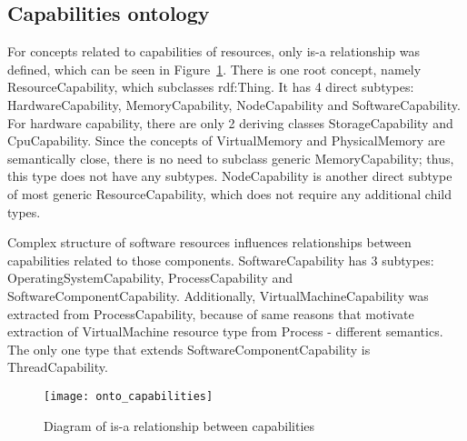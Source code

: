 \pagebreak

\subsection{Capabilities ontology}
\label{subsec:arch_knowledge_capabilitie}

For concepts related to capabilities of resources, only is-a relationship was defined, which can be seen in Figure~\ref{fig:onto_capabilities}. There is one root concept, namely ResourceCapability, which subclasses rdf:Thing. It has 4 direct subtypes: HardwareCapability, MemoryCapability, NodeCapability and SoftwareCapability. For hardware capability, there are only 2 deriving classes StorageCapability and CpuCapability. Since the concepts of VirtualMemory and PhysicalMemory are semantically close, there is no need to subclass generic MemoryCapability; thus, this type does not have any subtypes. NodeCapability is another direct subtype of most generic ResourceCapability, which does not require any additional child types.

Complex structure of software resources influences relationships between capabilities related to those components. SoftwareCapability has 3 subtypes: OperatingSystemCapability, ProcessCapability and SoftwareComponentCapability. Additionally, VirtualMachineCapability was extracted from ProcessCapability, because of same reasons that motivate extraction of VirtualMachine resource type from Process - different semantics. The only one type that extends SoftwareComponentCapability is ThreadCapability.

\begin{figure}[ht]
\centering
\texttt{[image: onto\_capabilities]}
\caption{Diagram of is-a relationship between capabilities}
\label{fig:onto_capabilities}
\end{figure}

